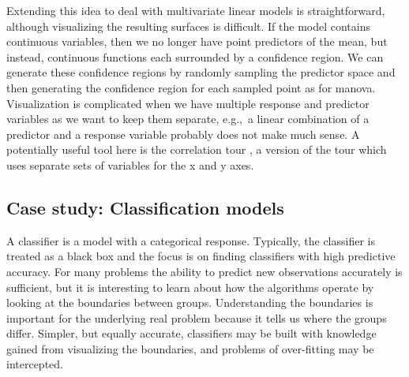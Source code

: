 \documentclass[preprint]{imsart}
\begin{document}

Extending this idea to deal with multivariate linear models is straightforward, although visualizing the resulting surfaces is difficult.  If the model contains continuous variables, then we  no longer have point predictors of the mean, but instead, continuous functions each surrounded by a confidence region.  We can generate these confidence regions by randomly sampling the predictor space and then generating the confidence region for each sampled point as for {\sc manova}.  Visualization is complicated when we have multiple response and predictor variables as we want to keep them separate, e.g.,\ a linear combination of a predictor and a response variable probably does not make much sense.  A potentially useful tool here is the correlation tour \citep{Buja04computationalmethods}, a version of the tour which uses separate sets of variables for the x and y axes.


\subsection{Case study: Classification models}
\label{sub:classifly}

A classifier is a model with a categorical response.  Typically, the classifier is treated as a black box and the focus is on finding classifiers with high predictive accuracy. For many problems the ability to predict new observations accurately is sufficient, but it is interesting to learn about how the algorithms operate by looking at the boundaries between groups. Understanding the boundaries is important for the underlying real problem because it tells us where the groups differ. Simpler, but equally accurate, classifiers may be built with knowledge gained from visualizing the boundaries, and problems of over-fitting may be intercepted.
\end{document}
